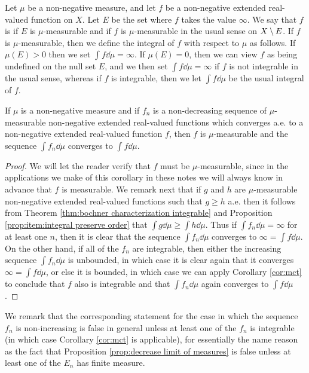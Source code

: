 \begin{definition}\label{def:extended real meas integrable}
Let $\mu$ be a non-negative measure, and let $f$ be a non-negative extended real-valued function on $X$. Let $E$ be the set where $f$ takes the value $\infty$. We say that $f$ is  if $E$ is $\mu$-measurable and if $f$ is $\mu$-measurable in the usual sense on $X\setminus E$. If $f$ is $\mu$-measurable, then we define the integral of $f$ with respect to $\mu$ as follows. If $\mu(E)>0$ then we set $\int f\dd\mu=\infty$. If $\mu(E)=0$, then we can view $f$ as being undefined on the null set $E$, and we then set $\int f\dd\mu=\infty$ if $f$ is not integrable in the usual sense, whereas if $f$ is integrable, then we let $\int f\dd\mu$ be the usual integral of $f$.
\end{definition}

\begin{corollary}\label{cor:mct extended real}
If $\mu$ is a non-negative measure and if $f_n$ is a non-decreasing sequence of $\mu$-measurable non-negative extended real-valued functions which converges a.e. to a non-negative extended real-valued function $f$, then $f$ is $\mu$-measurable and the sequence $\int f_n\dd\mu$ converges to $\int f\dd\mu$.
\end{corollary}

\begin{proof}
We will let the reader verify that $f$ must be $\mu$-measurable, since in the applications we make of this corollary in these notes we will always know in advance that $f$ is measurable. We remark next that if $g$ and $h$ are $\mu$-measurable non-negative extended real-valued functions such that $g\geq h$ a.e. then it follows from Theorem \ref{thm:bochner characterization integrable} and Proposition \ref{prop:item:integral preserve order} that $\int g\dd\mu\geq\int h\dd\mu$. Thus if $\int f_n\dd\mu=\infty$ for at least one $n$, then it is clear that the sequence $\int f_n\dd\mu$ converges to $\infty=\int f\dd\mu$. On the other hand, if all of the $f_n$ are integrable, then either the increasing sequence $\int f_n\dd\mu$ is unbounded, in which case it is clear again that it converges $\infty=\int f\dd\mu$, or else it is bounded, in which case we can apply Corollary \ref{cor:mct} to conclude that $f$ also is integrable and that $\int f_n\dd\mu$ again converges to $\int f\dd\mu$.
\end{proof}

We remark that the corresponding statement for the case in which the sequence $f_n$ is non-increasing is false in general unless at least one of the $f_n$ is integrable (in which case Corollary \ref{cor:mct} is applicable), for essentially the name reason as the fact that Proposition \ref{prop:decrease limit of measures} is false unless at least one of the $E_n$ has finite measure.

